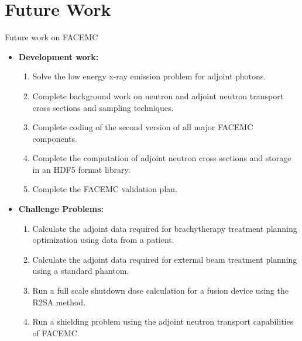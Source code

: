 \documentclass{beamer}
\begin{document}
\section{Future Work}
\begin{frame}{Future work on FACEMC}

  \begin{itemize}
    \item \textbf{Development work:} 
      \begin{enumerate}
        \item Solve the low energy x-ray emission problem for adjoint photons.
        \item Complete background work on neutron and adjoint neutron transport 
          cross sections and sampling techniques.
        \item Complete coding of the second version of all major FACEMC 
          components.
        \item Complete the computation of adjoint neutron cross sections and 
          storage in an HDF5 format library.
        \item Complete the FACEMC validation plan.
      \end{enumerate}
  \item \textbf{Challenge Problems:}
    \begin{enumerate}
      \item Calculate the adjoint data required for brachytherapy treatment 
        planning optimization using data from a patient.
      \item Calculate the adjoint data required for external beam treatment 
        planning using a standard phantom.
      \item Run a full scale shutdown dose calculation for a fusion device using
        the R2SA method.
      \item Run a shielding problem using the adjoint neutron transport 
        capabilities of FACEMC.
    \end{enumerate}
  \end{itemize}

\end{frame}

\end{document}
